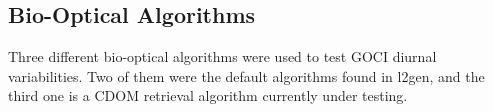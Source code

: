 \documentclass[onecolumn,3p,letterpaper,11pt]{elsarticle}
\begin{document}






\subsection{Bio-Optical Algorithms} \label{subsec:bioopalg}
Three different bio-optical algorithms were used to test GOCI diurnal variabilities. Two of them were the default algorithms found in l2gen, and the third one is a CDOM retrieval algorithm currently under testing.
\end{document}
